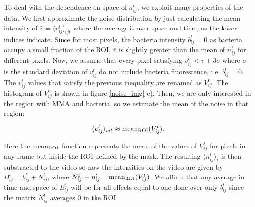 To deal with the dependence on space of $n_{ij}^t$, we exploit many properties of the data. We first approximate the noise distribution by just calculating the mean intensity of  $\bar{v} = \langle v_{ij}^t \rangle_{ijt}$ where the average is over space and time, as the lower indices indicate. Since for most pixels, the bacteria intensity $b_{ij}^t=0$ as bacteria occupy a small fraction of the ROI, $\bar{v}$ is slightly greater than the mean of $n_{ij}^t$ for different pixels. Now, we assume that every pixel satisfying $v_{ij}^t  < \bar{v} + 3 \sigma$ where $\sigma$ is the standard deviation of $v_{ij}^t$ do not include bacteria fluorescence, i.e. $b_{ij}^t =0$. The $v_{ij}^t$ values that satisfy the previous inequality are renamed as $V_{ij}^t$. The histogram of $V_{ij}^t$ is shown in figure \ref{noise_img} c). Then, we are only interested in the region with MMA and bacteria, so we estimate the mean of the noise in that region:

\begin{equation} \label{eq:noise_aproximation}
	\langle n_{ij}^t \rangle_{ijt} \approx {\rm mean_{ROI}}(V_{ij}^t).
\end{equation}


Here the ${\rm mean_{ROI}}$ function represents the mean of the values of $V_{ij}^t$ for pixels in any frame but inside the ROI defined by the mask. The resulting $\langle n_{ij}^t \rangle_t$ is then substracted to the video so now the intensities on the video are given by $B_{ij}^t  = b_{ij}^t + N_{ij}^t$, where $N_{ij}^t  = n_{ij}^t - {\rm mean_{ROI}}(V_{ij}^t)$. We affirm that any average in time and space of $B_{ij}^t$ will be for all effects equal to one done over only $b_{ij}^t$ since the matrix $N_{ij}^t $ averages 0 in the ROI. 



